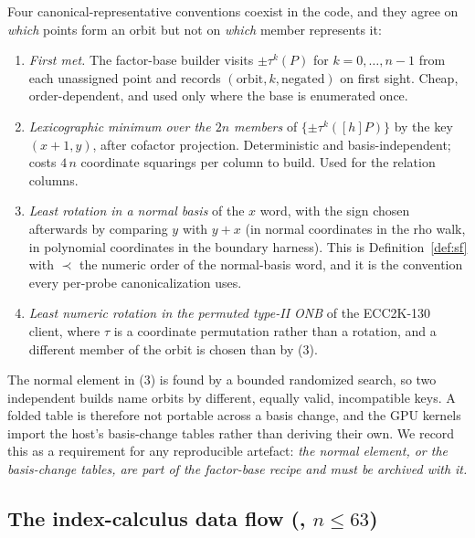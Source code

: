 Four canonical-representative conventions coexist in the code, and
they agree on \emph{which} points form an orbit but not on \emph{which}
member represents it:
\begin{enumerate}[leftmargin=1.6em,itemsep=0.2em]
\item \emph{First met.} The factor-base builder visits
  $\pm\tau^k(P)$ for $k=0,\dots,n-1$ from each unassigned point and
  records $(\text{orbit},k,\text{negated})$ on first sight. Cheap,
  order-dependent, and used only where the base is enumerated
  once.
\item \emph{Lexicographic minimum over the $2n$ members} of
  $\{\pm\tau^k([h]P)\}$ by the key $(x+1,y)$, after cofactor
  projection. Deterministic and basis-independent; costs $4\,n$
  coordinate squarings per column to build. Used for the relation
  columns.
\item \emph{Least rotation in a normal basis} of the $x$ word, with the
  sign chosen afterwards by comparing $y$ with $y+x$ (in normal
  coordinates in the rho walk, in polynomial coordinates in the
  boundary harness). This is Definition~\ref{def:sf} with $\prec$ the
  numeric order of the normal-basis word, and it is the convention
  every per-probe canonicalization uses.
\item \emph{Least numeric rotation in the permuted type-II ONB} of
  the ECC2K-130 client, where $\tau$ is a coordinate permutation
  rather than a rotation, and a different member of the orbit is
  chosen than by (3).
\end{enumerate}
The normal element in (3) is found by a bounded randomized search, so
two independent builds name orbits by different, equally valid,
incompatible keys. A folded table is therefore not portable across a
basis change, and the GPU kernels import the host's basis-change
tables rather than deriving their own. We record this as a
requirement for any reproducible artefact: \emph{the normal element,
or the basis-change tables, are part of the factor-base recipe and
must be archived with it.}

\subsection{The index-calculus data flow (\sibling, $n\le63$)}

